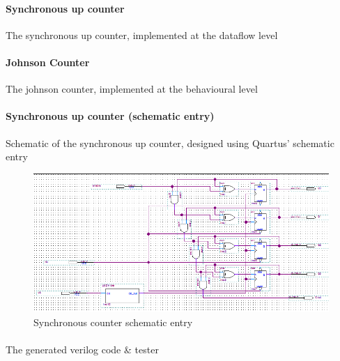 \documentclass{article}
\begin{document}
		\paragraph{Synchronous up counter} The synchronous up counter, implemented at the dataflow level
		
		

		\paragraph{Johnson Counter} The johnson counter, implemented at the behavioural level
		
		

		\paragraph{Synchronous up counter (schematic entry)} Schematic of the synchronous up counter, designed using Quartus' schematic entry

		\begin{figure}[H]
			\centering
			\includegraphics[width=0.75\linewidth]{figures/gate_diagrams/schem_synUp.png}
			\caption{Synchronous counter schematic entry}
			\label{fig:synUp_schem}
		\end{figure}

		\paragraph{} The generated verilog code \& tester
		
		
\end{document}
